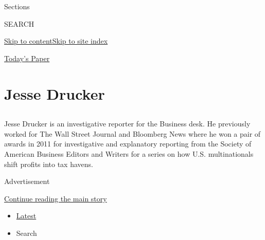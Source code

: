 Sections

SEARCH

\protect\hyperlink{site-content}{Skip to
content}\protect\hyperlink{site-index}{Skip to site index}

\href{https://myaccount.nytimes3xbfgragh.onion/auth/login?response_type=cookie\&client_id=vi}{}

\href{https://www.nytimes3xbfgragh.onion/section/todayspaper}{Today's
Paper}

\hypertarget{jesse-drucker}{%
\section{Jesse Drucker}\label{jesse-drucker}}

\subsection{}

Jesse Drucker is an investigative reporter for the Business desk. He
previously worked for The Wall Street Journal and Bloomberg News where
he won a pair of awards in 2011 for investigative and explanatory
reporting from the Society of American Business Editors and Writers for
a series on how U.S. multinationals shift profits into tax havens.~

Advertisement

\protect\hyperlink{after-mid1}{Continue reading the main story}

\begin{itemize}
\tightlist
\item
  \protect\hyperlink{stream-panel}{Latest}
\item
  Search
\end{itemize}

